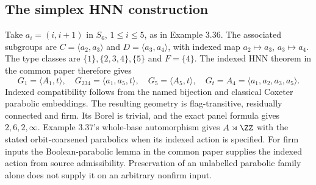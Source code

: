 \subsection{The simplex HNN construction}
Take $a_i=(i,i+1)$ in $S_6$, $1\leq i\leq5$, as in
Example 3.36. The associated subgroups are
$C=\langle a_2,a_3\rangle$ and $D=\langle a_3,a_4\rangle$,
with indexed map $a_2\mapsto a_3$, $a_3\mapsto a_4$.
The type classes are $\{1\},\{2,3,4\},\{5\}$ and $F=\{4\}$.
The indexed HNN theorem in the common paper therefore gives
\[
 G_1=\langle A_1,t\rangle,\quad G_{234}=\langle a_1,a_5,t\rangle,
 \quad G_5=\langle A_5,t\rangle,\quad
 G_t=A_4=\langle a_1,a_2,a_3,a_5\rangle.
\]
Indexed compatibility follows from the named bijection and classical
Coxeter parabolic embeddings. The resulting geometry is
flag-transitive, residually connected and firm. Its Borel is trivial,
and the exact panel formula gives $2,6,2,\infty$.
Example 3.37's whole-base automorphism gives $A\rtimes\ZZ$ with
the stated orbit-coarsened parabolics when its indexed action is
specified. For firm inputs the Boolean-parabolic lemma in the common paper
supplies the indexed action from source admissibility. Preservation
of an unlabelled parabolic family alone does not supply it on an
arbitrary nonfirm input.
